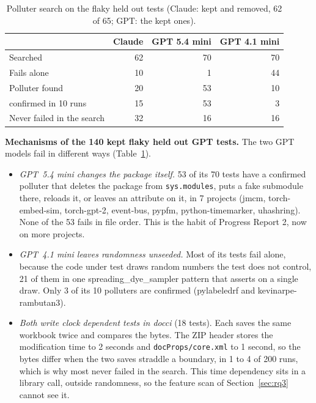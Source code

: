 \begin{table}[htbp]
\caption{Polluter search on the flaky held out tests (Claude: kept and removed, 62 of 65; GPT: the kept ones).}
\label{tab:polluters}
\small
\begin{tabular}{lrrr}
\toprule
 & Claude & GPT 5.4 mini & GPT 4.1 mini \\
\midrule
Searched & 62 & 70 & 70 \\
Fails alone & 10 & 1 & 44 \\
Polluter found & 20 & 53 & 10 \\
\quad confirmed in 10 runs & 15 & 53 & 3 \\
Never failed in the search & 32 & 16 & 16 \\
\bottomrule
\end{tabular}
\end{table}

\textbf{Mechanisms of the 140 kept flaky held out GPT tests.} The two GPT models fail in different ways (Table~\ref{tab:polluters}).
\begin{itemize}
\item \emph{GPT~5.4 mini changes the package itself.} 53 of its 70 tests have a confirmed polluter that deletes the package from \texttt{sys.modules}, puts a fake submodule there, reloads it, or leaves an attribute on it, in 7 projects (jmcm, torch-embed-sim, torch-gpt-2, event-bus, pypfm, python-timemarker, uhashring). None of the 53 fails in file order. This is the habit of Progress Report 2, now on more projects.
\item \emph{GPT~4.1 mini leaves randomness unseeded.} Most of its tests fail alone, because the code under test draws random numbers the test does not control, 21 of them in one spreading\_dye\_sampler pattern that asserts on a single draw. Only 3 of its 10 polluters are confirmed (pylabeledrf and kevinarpe-rambutan3).
\item \emph{Both write clock dependent tests in docci} (18 tests). Each saves the same workbook twice and compares the bytes. The ZIP header stores the modification time to 2 seconds and \texttt{docProps/core.xml} to 1 second, so the bytes differ when the two saves straddle a boundary, in 1 to 4 of 200 runs, which is why most never failed in the search. This time dependency sits in a library call, outside randomness, so the feature scan of Section~\ref{sec:rq3} cannot see it.
\end{itemize}

